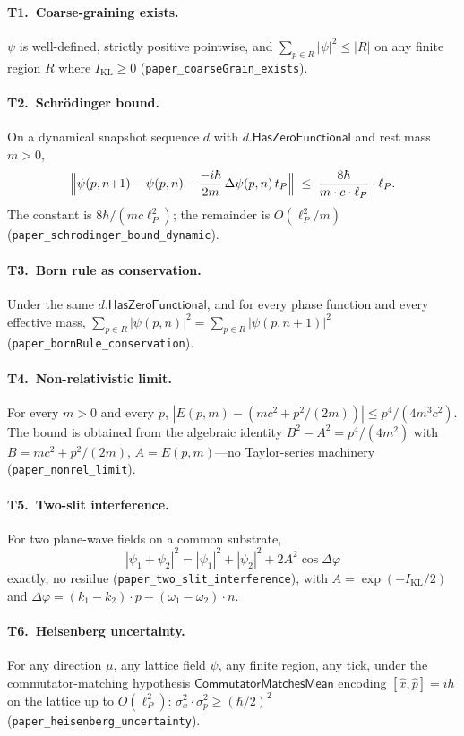\documentclass[aps,prl,twocolumn,superscriptaddress,nofootinbib,10pt]{revtex4-2}
\newcommand{\KL}{I_{\mathrm{KL}}}
\newcommand{\lP}{\ell_P}
\newcommand{\tP}{t_P}
\newcommand{\HasZF}{\mathsf{HasZeroFunctional}}
\newcommand{\CMM}{\mathsf{CommutatorMatchesMean}}
\begin{document}
\paragraph{T1.\ Coarse-graining exists.}
$\psi$ is well-defined, strictly positive pointwise, and
$\sum_{p\in R}|\psi|^{2}\le |R|$ on any finite region $R$ where
$\KL\ge 0$ (\texttt{paper\_coarseGrain\_exists}).

\paragraph{T2.\ Schr\"odinger bound.}
On a dynamical snapshot sequence $d$ with $d.\HasZF$ and rest mass
$m>0$,
\[
\Bigl\|\psi(p,n{+}1)-\psi(p,n)
 -\frac{-i\hbar}{2m}\,\Delta\psi(p,n)\,\tP\Bigr\|
\;\le\; \frac{8\hbar}{m\cdot c\cdot\lP}\cdot\lP.
\]
The constant is $8\hbar/(mc\lP^{2})$; the remainder is $O(\lP^{2}/m)$
(\texttt{paper\_schrodinger\_bound\_dynamic}).

\paragraph{T3.\ Born rule as conservation.}
Under the same $d.\HasZF$, and for every phase function and every
effective mass,
$\sum_{p\in R}|\psi(p,n)|^{2}
 =\sum_{p\in R}|\psi(p,n{+}1)|^{2}$
(\texttt{paper\_bornRule\_conservation}).

\paragraph{T4.\ Non-relativistic limit.}
For every $m>0$ and every $p$,
$|E(p,m)-(mc^{2}+p^{2}/(2m))|\le p^{4}/(4m^{3}c^{2})$. The bound is
obtained from the algebraic identity $B^{2}-A^{2}=p^{4}/(4m^{2})$
with $B=mc^{2}+p^{2}/(2m)$, $A=E(p,m)$---no Taylor-series machinery
(\texttt{paper\_nonrel\_limit}).

\paragraph{T5.\ Two-slit interference.}
For two plane-wave fields on a common substrate,
\[
|\psi_{1}+\psi_{2}|^{2}
 = |\psi_{1}|^{2}+|\psi_{2}|^{2}+2A^{2}\cos\Delta\varphi
\]
exactly, no residue
(\texttt{paper\_two\_slit\_interference}), with
$A=\exp(-\KL/2)$ and $\Delta\varphi=(k_{1}-k_{2})\cdot p-(\omega_{1}-\omega_{2})\cdot n$.

\paragraph{T6.\ Heisenberg uncertainty.}
For any direction $\mu$, any lattice field $\psi$, any finite region,
any tick, under the commutator-matching hypothesis $\CMM$ encoding
$[\hat{x},\hat{p}]=i\hbar$ on the lattice up to $O(\lP^{2})$:
$\sigma_{x}^{2}\cdot\sigma_{p}^{2}\ge(\hbar/2)^{2}$
(\texttt{paper\_heisenberg\_uncertainty}).
\end{document}
